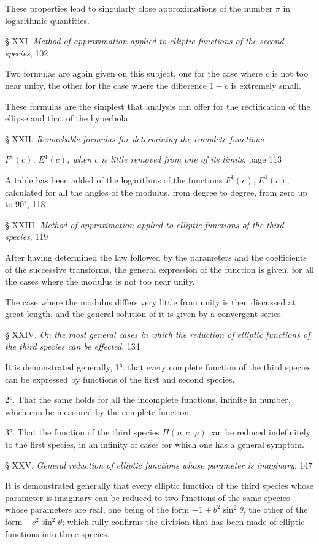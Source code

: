 \documentclass{article}
\begin{document}
These properties lead to singularly close approximations of the number $\pi$ in logarithmic quantities.

§ XXI. \emph{Method of approximation applied to elliptic functions of the second species}, 102

Two formulas are again given on this subject, one for the case where $c$ is not too near unity, the other for the case where the difference $1-c$ is extremely small.

These formulas are the simplest that analysis can offer for the rectification of the ellipse and that of the hyperbola.

§ XXII. \emph{Remarkable formulas for determining the complete functions}

\emph{$F^{1}(c)$, $E^{1}(c)$, when $c$ is little removed from one of its limits}, page 113

A table has been added of the logarithms of the functions $F^{1}(c)$, $E^{1}(c)$, calculated for all the angles of the modulus, from degree to degree, from zero up to $90^{\circ}$, 118

§ XXIII. \emph{Method of approximation applied to elliptic functions of the third species}, 119

After having determined the law followed by the parameters and the coefficients of the successive transforms, the general expression of the function is given, for all the cases where the modulus is not too near unity.

The case where the modulus differs very little from unity is then discussed at great length, and the general solution of it is given by a convergent series.

§ XXIV. \emph{On the most general cases in which the reduction of elliptic functions of the third species can be effected}, 134

It is demonstrated generally, 1°. that every complete function of the third species can be expressed by functions of the first and second species.

2°. That the same holds for all the incomplete functions, infinite in number, which can be measured by the complete function.

3°. That the function of the third species $\Pi(n,c,\varphi)$ can be reduced indefinitely to the first species, in an infinity of cases for which one has a general symptom.

§ XXV. \emph{General reduction of elliptic functions whose parameter is imaginary}, 147

It is demonstrated generally that every elliptic function of the third species whose parameter is imaginary can be reduced to two functions of the same species whose parameters are real, one being of the form $-1+b^{2}\sin^{2}\theta$, the other of the form $-c^{2}\sin^{2}\theta$; which fully confirms the division that has been made of elliptic functions into three species.
\end{document}
